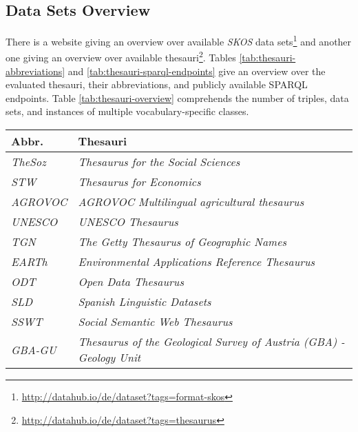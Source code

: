 \documentclass{llncs}
\begin{document}
\subsection{Data Sets Overview}

There is a website giving an overview over available \emph{SKOS} data sets\footnote{\url{http://datahub.io/de/dataset?tags=format-skos}}
and another one giving an overview over available thesauri\footnote{\url{http://datahub.io/de/dataset?tags=thesaurus}}.
Tables \ref{tab:thesauri-abbreviations} and \ref{tab:thesauri-sparql-endpoints} give an overview over the evaluated thesauri, their abbreviations, and publicly available SPARQL endpoints.
Table \ref{tab:thesauri-overview} comprehends the number of triples, data sets, and instances of multiple vocabulary-specific classes.

\begin{table}[H]
	\centering
		\begin{tabular}{l|l}
      \textbf{Abbr.} & \textbf{Thesauri} \\		
      \hline
    \emph{TheSoz} & \emph{Thesaurus for the Social Sciences}\tablefootnote{\url{http://www.ecb.europa.eu/home/html/index.en.html}} \\
	  \emph{STW} & \emph{Thesaurus for Economics}\tablefootnote{\url{http://zbw.eu/stw/versions/latest/about}} \\
	  \emph{AGROVOC} & \emph{AGROVOC Multilingual agricultural thesaurus}\tablefootnote{\url{http://202.45.139.84:10035/catalogs/fao/repositories/agrovoc}} \\
		\emph{UNESCO} & \emph{UNESCO Thesaurus}\tablefootnote{\url{http://skos.um.es/sparql/}} \\
		\emph{TGN} & \emph{The Getty Thesaurus of Geographic Names}\tablefootnote{\url{http://vocab.getty.edu/sparql}} \\
		\emph{EARTh} & \emph{Environmental Applications Reference Thesaurus}\tablefootnote{\url{http://linkeddata.ge.imati.cnr.it/resource/EARTh/}} \\
		\emph{ODT} & \emph{Open Data Thesaurus}\tablefootnote{\url{http://vocabulary.semantic-web.at/PoolParty/wiki/OpenData}} \\
		\emph{SLD} & \emph{Spanish Linguistic Datasets}\tablefootnote{\url{http://linguistic.linkeddata.es}} \\
		\emph{SSWT} & \emph{Social Semantic Web Thesaurus}\tablefootnote{\url{http://vocabulary.semantic-web.at/PoolParty/wiki/semweb}} \\
		\emph{GBA-GU} & \emph{Thesaurus of the Geological Survey of Austria (GBA) - Geology Unit}\tablefootnote{\url{http://resource.geolba.ac.at/}} \\

\end{tabular}
\end{table}
\end{document}
